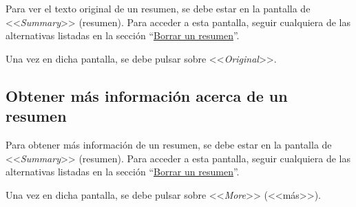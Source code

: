 Para ver el texto original de un resumen, se debe estar en la pantalla de <<\emph{Summary}>> (resumen). Para acceder a esta pantalla, seguir cualquiera de las alternativas listadas en la sección ``\hyperref[subsection:borrar]{Borrar un resumen}''.

Una vez en dicha pantalla, se debe pulsar sobre <<\emph{Original}>>.

\subsection{Obtener más información acerca de un resumen}

Para obtener más información de un resumen, se debe estar en la pantalla de <<\emph{Summary}>> (resumen). Para acceder a esta pantalla, seguir cualquiera de las alternativas listadas en la sección ``\hyperref[subsection:borrar]{Borrar un resumen}''.

Una vez en dicha pantalla, se debe pulsar sobre <<\emph{More}>> (<<más>>).